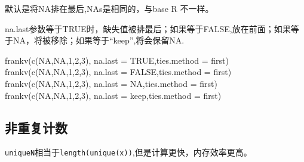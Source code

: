 \documentclass[
]{book}
\newenvironment{Shaded}{\begin{snugshade}}{\end{snugshade}}
\newcommand{\AttributeTok}[1]{\textcolor[rgb]{0.77,0.63,0.00}{#1}}
\newcommand{\ConstantTok}[1]{\textcolor[rgb]{0.00,0.00,0.00}{#1}}
\newcommand{\DecValTok}[1]{\textcolor[rgb]{0.00,0.00,0.81}{#1}}
\newcommand{\FunctionTok}[1]{\textcolor[rgb]{0.00,0.00,0.00}{#1}}
\newcommand{\NormalTok}[1]{#1}
\newcommand{\StringTok}[1]{\textcolor[rgb]{0.31,0.60,0.02}{#1}}
\begin{document}
默认是将NA排在最后,NAs是相同的，与base R 不一样。

na.last参数等于TRUE时，缺失值被排最后；如果等于FALSE,放在前面；如果等于NA，将被移除；如果等于``keep'',将会保留NA.

\begin{Shaded}
\begin{Highlighting}[]
\FunctionTok{frankv}\NormalTok{(}\FunctionTok{c}\NormalTok{(}\ConstantTok{NA}\NormalTok{,}\ConstantTok{NA}\NormalTok{,}\DecValTok{1}\NormalTok{,}\DecValTok{2}\NormalTok{,}\DecValTok{3}\NormalTok{), }\AttributeTok{na.last =} \ConstantTok{TRUE}\NormalTok{,}\AttributeTok{ties.method =} \StringTok{\textquotesingle{}first\textquotesingle{}}\NormalTok{)}
\FunctionTok{frankv}\NormalTok{(}\FunctionTok{c}\NormalTok{(}\ConstantTok{NA}\NormalTok{,}\ConstantTok{NA}\NormalTok{,}\DecValTok{1}\NormalTok{,}\DecValTok{2}\NormalTok{,}\DecValTok{3}\NormalTok{), }\AttributeTok{na.last =} \ConstantTok{FALSE}\NormalTok{,}\AttributeTok{ties.method =} \StringTok{\textquotesingle{}first\textquotesingle{}}\NormalTok{)}
\FunctionTok{frankv}\NormalTok{(}\FunctionTok{c}\NormalTok{(}\ConstantTok{NA}\NormalTok{,}\ConstantTok{NA}\NormalTok{,}\DecValTok{1}\NormalTok{,}\DecValTok{2}\NormalTok{,}\DecValTok{3}\NormalTok{), }\AttributeTok{na.last =} \ConstantTok{NA}\NormalTok{,}\AttributeTok{ties.method =} \StringTok{\textquotesingle{}first\textquotesingle{}}\NormalTok{)}
\FunctionTok{frankv}\NormalTok{(}\FunctionTok{c}\NormalTok{(}\ConstantTok{NA}\NormalTok{,}\ConstantTok{NA}\NormalTok{,}\DecValTok{1}\NormalTok{,}\DecValTok{2}\NormalTok{,}\DecValTok{3}\NormalTok{), }\AttributeTok{na.last =} \StringTok{\textquotesingle{}keep\textquotesingle{}}\NormalTok{,}\AttributeTok{ties.method =} \StringTok{\textquotesingle{}first\textquotesingle{}}\NormalTok{)}
\end{Highlighting}
\end{Shaded}

\hypertarget{ux975eux91cdux590dux8ba1ux6570}{%
\subsection{非重复计数}\label{ux975eux91cdux590dux8ba1ux6570}}

\texttt{uniqueN}相当于\texttt{length(unique(x))},但是计算更快，内存效率更高。
\end{document}
